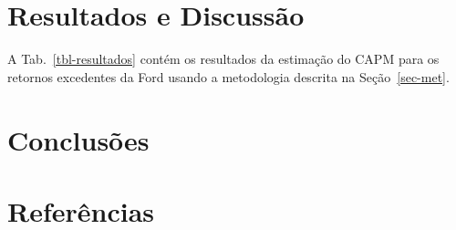 \documentclass[
  12pt,
  a4paperpaper,
]{article}
\begin{document}
\section{Resultados e Discussão}\label{sec-resultados}

A Tab.~\ref{tbl-resultados} contém os resultados da estimação do CAPM
para os retornos excedentes da Ford usando a metodologia descrita na
Seção~\ref{sec-met}.

\begin{table}

\caption{\label{tbl-resultados}Resultados da Estimação do CAPM}


\end{table}%

\section{Conclusões}\label{sec-conclusoes}

\section*{Referências}\label{referuxeancias}
\end{document}

